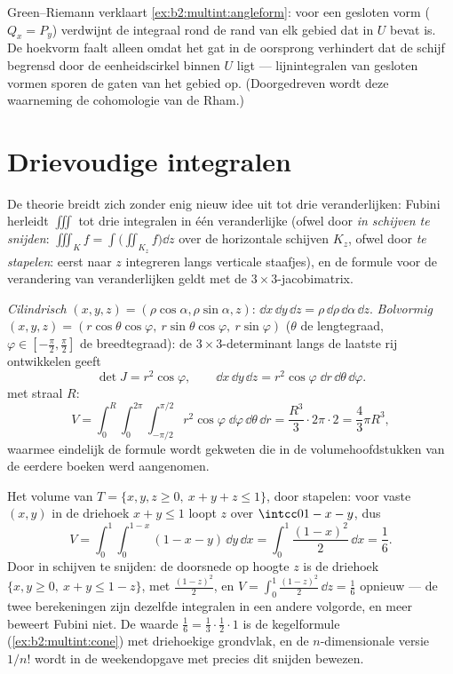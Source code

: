 \begin{remark}
Green--Riemann verklaart \cref{ex:b2:multint:angleform}: voor een
gesloten vorm ($Q_x = P_y$) verdwijnt de integraal rond de rand van
elk gebied dat in $U$ bevat is. De hoekvorm faalt alleen omdat het
gat in de oorsprong verhindert dat de schijf begrensd door de
eenheidscirkel binnen $U$ ligt --- lijnintegralen van gesloten
vormen sporen de gaten van het gebied op. (Doorgedreven wordt deze
waarneming de cohomologie van de Rham.)
\end{remark}

\section{Drievoudige integralen}

De theorie breidt zich zonder enig nieuw idee uit tot drie
veranderlijken: Fubini herleidt $\iiint$ tot drie integralen in één
veranderlijke (ofwel door \emph{in schijven te snijden}: $\iiint_K
f = \int\bigl(\iint_{K_z} f\bigr)\dd z$ over de horizontale
schijven $K_z$, ofwel door \emph{te stapelen}: eerst naar $z$
integreren langs verticale staafjes), en de formule voor de
verandering van veranderlijken geldt met de
$3 \times 3$-jacobimatrix.

\begin{example}\label{ex:b2:multint:spherical}
\emph{Cilindrisch} $(x, y, z) = (\rho\cos\alpha, \rho\sin\alpha,
z)$: $\dd x\,\dd y\,\dd z = \rho\,\dd\rho\,\dd\alpha\,\dd z$.
\emph{Bolvormig} $(x, y, z) = (r\cos\theta\cos\varphi,\
r\sin\theta\cos\varphi,\ r\sin\varphi)$ ($\theta$ de lengtegraad,
$\varphi \in [-\frac\pi2, \frac\pi2]$ de breedtegraad): de $3
\times 3$-determinant langs de laatste rij ontwikkelen geeft
\[
\det J = r^2\cos\varphi ,
\qquad
\dd x\,\dd y\,\dd z
= r^2\cos\varphi\;\dd r\,\dd\theta\,\dd\varphi .
\]
 met straal $R$:
\[
V = \int_0^R\!\!\int_0^{2\pi}\!\!\int_{-\pi/2}^{\pi/2}
r^2\cos\varphi\;\dd\varphi\,\dd\theta\,\dd r
= \frac{R^3}{3}\cdot 2\pi \cdot 2
= \boxed{\frac43\pi R^3} ,
\]
waarmee eindelijk de formule wordt gekweten die in de
volumehoofdstukken van de eerdere boeken werd aangenomen.
\end{example}

\begin{example}
\label{ex:b2:multint:tetra}
Het volume van $T = \{x, y, z \geq 0,\ x + y + z \leq 1\}$, door
stapelen: voor vaste $(x, y)$ in de driehoek $x + y \leq 1$ loopt
$z$ over $\intcc0{1 - x - y}$, dus
\[
V = \int_0^1\!\!\int_0^{1-x}(1 - x - y)\,\dd y\,\dd x
= \int_0^1\frac{(1 - x)^2}{2}\,\dd x = \frac16 .
\]
Door in schijven te snijden: de doorsnede op hoogte $z$ is de
driehoek $\{x, y \geq 0,\ x + y \leq 1 - z\}$, met 
$\frac{(1-z)^2}2$, en $V = \int_0^1\frac{(1-z)^2}2\,\dd z =
\frac16$ opnieuw --- de twee berekeningen zijn dezelfde integralen
in een andere volgorde, en meer beweert Fubini niet. De waarde
$\frac16 = \frac13\cdot\frac12\cdot1$ is de kegelformule
(\cref{ex:b2:multint:cone}) met driehoekige grondvlak, en de
$n$-dimensionale versie $1/n!$ wordt in de weekendopgave met
precies dit snijden bewezen.
\end{example}

